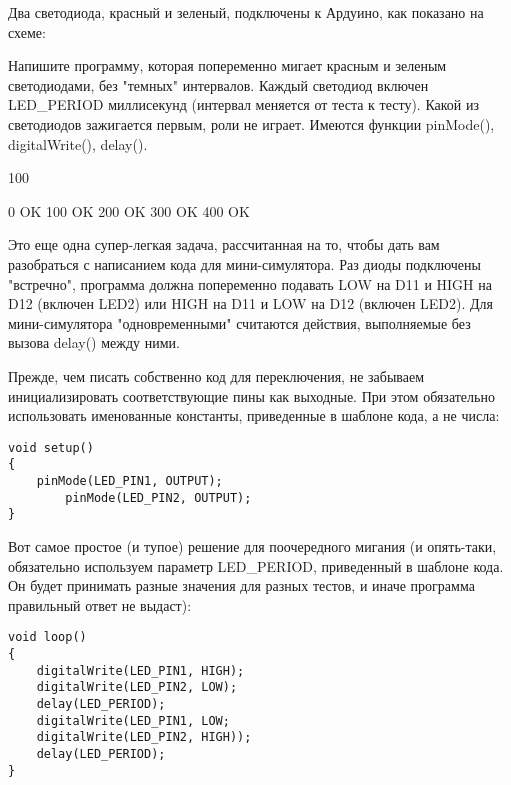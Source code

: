 
Два светодиода, красный и зеленый, подключены к Ардуино, как показано на схеме:


Напишите программу, которая попеременно мигает красным и зеленым светодиодами, без "темных" 
интервалов.  Каждый светодиод включен LED\_PERIOD миллисекунд (интервал меняется от теста к тесту).  
Какой из светодиодов зажигается первым,  роли не играет.  Имеются функции  pinMode(), 
digitalWrite(), delay().  

\begin{myverbbox}[\small]{\vinput}
    100
\end{myverbbox}
\begin{myverbbox}[\small]{\voutput}
    0 OK
    100 OK
    200 OK
    300 OK
    400 OK
\end{myverbbox}

\solutionSection

Это еще одна супер-легкая задача, рассчитанная на то, чтобы дать вам разобраться с написанием кода для мини-симулятора.  Раз диоды подключены "встречно", программа должна попеременно подавать LOW на D11 и HIGH на D12 (включен LED2) или  HIGH на D11 и LOW на D12 (включен LED2).  Для мини-симулятора "одновременными" считаются действия, выполняемые без вызова delay() между ними.  

Прежде, чем писать собственно код для переключения, не забываем инициализировать соответствующие пины как выходные.  При этом обязательно использовать именованные константы, приведенные в шаблоне кода,  а не числа:

\begin{verbatim}
void setup()
{
    pinMode(LED_PIN1, OUTPUT);
        pinMode(LED_PIN2, OUTPUT);
}        
\end{verbatim}

Вот самое простое (и тупое) решение для поочередного мигания (и опять-таки, обязательно используем параметр LED\_PERIOD, приведенный в шаблоне кода. Он будет принимать разные значения для разных тестов, и иначе программа правильный ответ не выдаст):

\begin{verbatim}
void loop()
{
    digitalWrite(LED_PIN1, HIGH);
    digitalWrite(LED_PIN2, LOW);
    delay(LED_PERIOD); 
    digitalWrite(LED_PIN1, LOW;
    digitalWrite(LED_PIN2, HIGH));
    delay(LED_PERIOD); 
}            
\end{verbatim}


